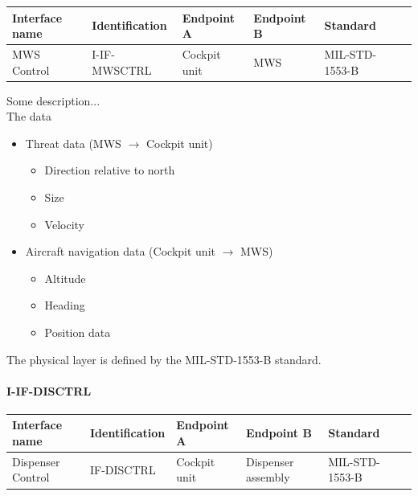 \begin{center}
\begin{tabular}{ | p{2cm} | l | p{2.3cm} | p{2.3cm} | l | p{1cm} |}
\hline
 \textbf{Interface name} & \textbf{Identification} & \textbf{Endpoint A} & \textbf{Endpoint B} & \textbf{Standard}\\ \hline

 MWS Control & I-IF-MWSCTRL & Cockpit unit & MWS & MIL-STD-1553-B\\ \hline

\end{tabular}
\end{center}

Some description...
\\
The data 
\begin{itemize}
\item Threat data (MWS $\rightarrow$ Cockpit unit)
	\begin{itemize}
	\item Direction relative to north
	\item Size
	\item Velocity
	\end{itemize}
\item Aircraft navigation data (Cockpit unit $\rightarrow$ MWS)
	\begin{itemize}
	\item Altitude
	\item Heading
	\item Position data
	\end{itemize}
\end{itemize}
The physical layer is defined by the MIL-STD-1553-B standard.


\paragraph{I-IF-DISCTRL}

\begin{center}
\begin{tabular}{ | p{2cm} | l | p{2.3cm} | p{2.3cm} | l | p{1cm} |}
\hline
 \textbf{Interface name} & \textbf{Identification} & \textbf{Endpoint A} & \textbf{Endpoint B} & \textbf{Standard}\\ \hline

 Dispenser Control & IF-DISCTRL & Cockpit unit & Dispenser assembly & MIL-STD-1553-B\\ \hline
 
\end{tabular}
\end{center}

